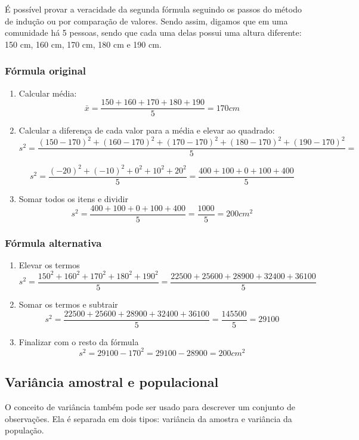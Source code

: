 É possível provar a veracidade da segunda fórmula seguindo os passos do método de indução ou por comparação de valores. Sendo assim, digamos que em uma comunidade há 5 pessoas, sendo que cada uma delas possui uma altura diferente: 150 cm, 160 cm, 170 cm, 180 cm e 190 cm.

\subsubsection{Fórmula original}
\begin{enumerate}
    \item Calcular média:
    \[\bar{x} = \frac{150+160+170+180+190}{5} = 170cm\]

    \item Calcular a diferença de cada valor para a média e elevar ao quadrado:
    \[s^2 = \frac{(150 - 170)^2 + (160 - 170)^2 + (170 - 170)^2 + (180 - 170)^2 + (190 - 170)^2}{5} = \]


    \[s^2 = \frac{(-20)^2 + (-10)^2 + 0^2 + 10^2 + 20^2}{5} = \frac{400 + 100 + 0 + 100 + 400}{5}\]

    \item Somar todos os itens e dividir
    \[s^2 = \frac{400 + 100 + 0 + 100 + 400}{5} = \frac{1000}{5} = 200cm^2\]
\end{enumerate}

\subsubsection{Fórmula alternativa}
\begin{enumerate}
    \item  Elevar os termos
    \[s^2 = \frac{150^2 + 160^2 + 170^2 + 180^2 + 190^2}{5} = \frac{22500 + 25600 + 28900 + 32400 + 36100}{5}\]

    \item  Somar os termos e subtrair
    \[s^2 = \frac{22500 + 25600 + 28900 + 32400 + 36100}{5} = \frac{145500}{5} = 29100\]

    \item  Finalizar com o resto da fórmula
    \[s^2 = 29100 - 170^2 = 29100 - 28900 = 200cm^2\]
\end{enumerate}

\subsection{Variância amostral e populacional}
O conceito de variância também pode ser usado para descrever um conjunto de observações. Ela é separada em dois tipos: variância da amostra e variância da população.

